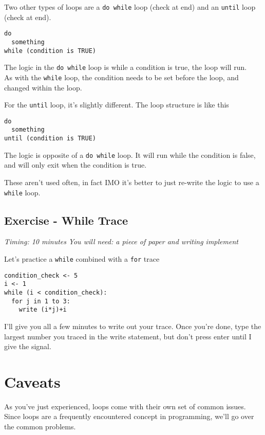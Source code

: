 \documentclass[
]{book}
\begin{document}
Two other types of loops are a \texttt{do\ while} loop (check at end) and an \texttt{until} loop (check at end).

\begin{verbatim}
do
  something
while (condition is TRUE)
\end{verbatim}

The logic in the \texttt{do\ while} loop is while a condition is true, the loop will run.\\
As with the \texttt{while} loop, the condition needs to be set before the loop, and changed within the loop.

For the \texttt{until} loop, it's slightly different. The loop structure is like this

\begin{verbatim}
do
  something
until (condition is TRUE)
\end{verbatim}

The logic is opposite of a \texttt{do\ while} loop. It will run while the condition is false, and will only exit when the condition is true.

These aren't used often, in fact IMO it's better to just re-write the logic to use a \texttt{while} loop.

\subsection{Exercise - While Trace}\label{exercise---while-trace}

\emph{Timing: 10 minutes}
\emph{You will need: a piece of paper and writing implement}

Let's practice a \texttt{while} combined with a \texttt{for} trace

\begin{verbatim}
condition_check <- 5
i <- 1
while (i < condition_check):
  for j in 1 to 3:
    write (i*j)+i
\end{verbatim}

I'll give you all a few minutes to write out your trace. Once you're done,
type the largest number you traced in the write statement, but don't press enter until I give the signal.

\section{Caveats}\label{caveats}

As you've just experienced, loops come with their own set of common issues.\\
Since loops are a frequently encountered concept in programming, we'll go over the common problems.
\end{document}
